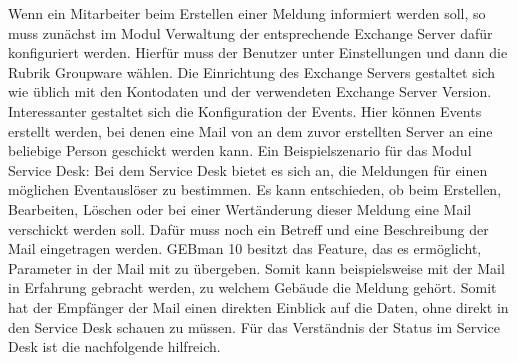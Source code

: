 \noindent
Wenn ein Mitarbeiter beim Erstellen einer Meldung informiert werden soll, so muss zunächst im Modul Verwaltung der entsprechende Exchange Server dafür konfiguriert werden. Hierfür muss der Benutzer unter Einstellungen und dann die Rubrik Groupware wählen. Die Einrichtung des Exchange Servers gestaltet sich wie üblich mit den Kontodaten und der verwendeten Exchange Server Version.\newline
Interessanter gestaltet sich die Konfiguration der Events. Hier können Events erstellt werden, bei denen eine Mail von an dem zuvor erstellten Server an eine beliebige Person geschickt werden kann. Ein Beispielszenario für das Modul Service Desk:\newline
Bei dem Service Desk bietet es sich an, die Meldungen für einen möglichen Eventauslöser zu bestimmen. Es kann entschieden, ob beim Erstellen, Bearbeiten, Löschen oder bei einer Wertänderung dieser Meldung eine Mail verschickt werden soll. Dafür muss noch ein Betreff und eine Beschreibung der Mail eingetragen werden. GEBman 10 besitzt das Feature, das es ermöglicht, Parameter in der Mail mit zu übergeben. Somit kann beispielsweise mit der Mail in Erfahrung gebracht werden, zu welchem Gebäude die Meldung gehört. Somit hat der Empfänger der Mail einen direkten Einblick auf die Daten, ohne direkt in den Service Desk schauen zu müssen.\newline
Für das Verständnis der Status im Service Desk ist die nachfolgende hilfreich.

